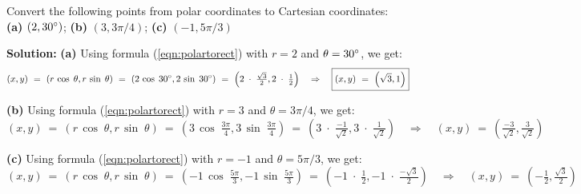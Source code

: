 \begin{exmp}
Convert the following points from polar coordinates to Cartesian coordinates:\\
\textbf{(a)} $(2,30^\circ)$; \textbf{(b)} $(3,3\pi/4)$; \textbf{(c)} $(-1,5\pi/3)$\vspace{1mm}
\par\noindent\textbf{Solution:} \textbf{(a)} Using formula (\ref{eqn:polartorect}) with $r=2$ and
$\theta = 30^\circ$, we get:
\begin{displaymath}
 (x,y) ~=~ ( r\,\cos\;\theta, r\,\sin\;\theta) ~=~ (2\,\cos\;30^\circ,2\,\sin\;30^\circ) ~=~
 \left(2 \;\cdot\; \tfrac{\sqrt{3}}{2}, 2 \;\cdot\; \tfrac{1}{2} \right) \quad\Rightarrow\quad
 \boxed{(x,y) ~=~ \left( \sqrt{3},1 \right)}
\end{displaymath}
 \par\noindent\textbf{(b)} Using formula (\ref{eqn:polartorect}) with $r=3$ and
 $\theta = 3\pi/4$, we get:
\begin{displaymath}
 (x,y) ~=~ ( r\,\cos\;\theta, r\,\sin\;\theta) ~=~ \left( 3\,\cos\;\tfrac{3\pi}{4},3\,\sin\;\tfrac{3\pi}{4}
 \right) ~=~ \left(3 \;\cdot\; \tfrac{-1}{\sqrt{2}}, 3 \;\cdot\; \tfrac{1}{\sqrt{2}} \right)
 \quad\Rightarrow\quad \boxed{(x,y) ~=~ \left( \tfrac{-3}{\sqrt{2}},\tfrac{3}{\sqrt{2}} \right)}
\end{displaymath}
 \par\noindent\textbf{(c)} Using formula (\ref{eqn:polartorect}) with $r=-1$ and
 $\theta = 5\pi/3$, we get:
\begin{displaymath}
 (x,y) ~=~ ( r\,\cos\;\theta, r\,\sin\;\theta) ~=~ \left( -1\,\cos\;\tfrac{5\pi}{3},-1\,\sin\;\tfrac{5\pi}{3}
 \right) ~=~ \left(-1 \;\cdot\; \tfrac{1}{2},-1 \;\cdot\; \tfrac{-\sqrt{3}}{2} \right)
 \quad\Rightarrow\quad \boxed{(x,y) ~=~ \left( -\tfrac{1}{2},\tfrac{\sqrt{3}}{2} \right)}
\end{displaymath}
\end{exmp}
